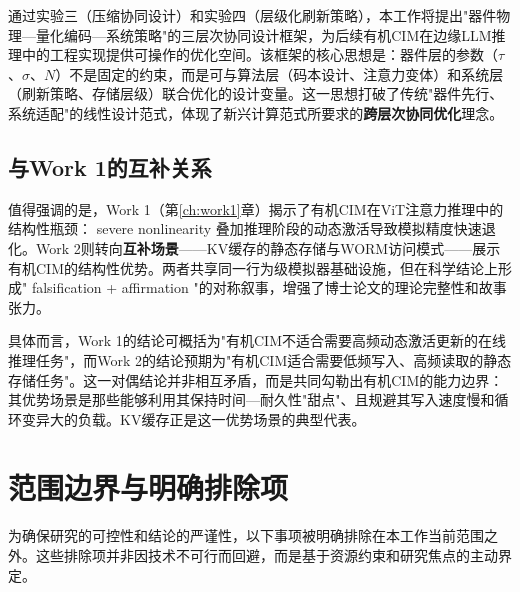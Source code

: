 通过实验三（压缩协同设计）和实验四（层级化刷新策略），本工作将提出"器件物理—量化编码—系统策略"的三层次协同设计框架，为后续有机CIM在边缘LLM推理中的工程实现提供可操作的优化空间。该框架的核心思想是：器件层的参数（$\tau$、$\sigma$、$N$）不是固定的约束，而是可与算法层（码本设计、注意力变体）和系统层（刷新策略、存储层级）联合优化的设计变量。这一思想打破了传统"器件先行、系统适配"的线性设计范式，体现了新兴计算范式所要求的\textbf{跨层次协同优化}理念。

\subsection{与Work 1的互补关系}

值得强调的是，Work 1（第\ref{ch:work1}章）揭示了有机CIM在ViT注意力推理中的结构性瓶颈： severe nonlinearity 叠加推理阶段的动态激活导致模拟精度快速退化。Work 2则转向\textbf{互补场景}——KV缓存的静态存储与WORM访问模式——展示有机CIM的结构性优势。两者共享同一行为级模拟器基础设施，但在科学结论上形成" falsification + affirmation "的对称叙事，增强了博士论文的理论完整性和故事张力。

具体而言，Work 1的结论可概括为"有机CIM不适合需要高频动态激活更新的在线推理任务"，而Work 2的结论预期为"有机CIM适合需要低频写入、高频读取的静态存储任务"。这一对偶结论并非相互矛盾，而是共同勾勒出有机CIM的能力边界：其优势场景是那些能够利用其保持时间—耐久性"甜点"、且规避其写入速度慢和循环变异大的负载。KV缓存正是这一优势场景的典型代表。


\section{范围边界与明确排除项}
\label{sec:work2_boundaries}

为确保研究的可控性和结论的严谨性，以下事项被明确排除在本工作当前范围之外。这些排除项并非因技术不可行而回避，而是基于资源约束和研究焦点的主动界定。

